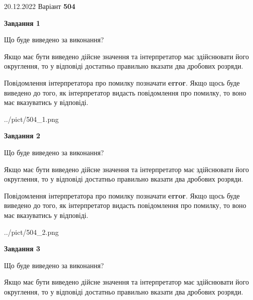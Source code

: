 \documentclass[12pt, ukrainian]{article}
\begin{document}
{20.12.2022 Варіант \No \textbf { 504 }\par}
{
\begin {Large}

{\begin {center}\textbf{Завдання 1}\end {center}}\par
Що буде виведено за виконання? \par

Якщо має бути виведено дійсне значення та інтерпретатор має здійснювати його округлення, 
то у відповіді достатньо правильно вказати два дробових розряди.

Повідомлення інтерпретатора про помилку позначати \textbf{error}.
Якщо щось буде виведено до того, як інтерпретатор видасть повідомлення про помилку, 
то воно має вказуватись у відповіді. \par

\begin{center}
	{../pict/504_1.png}
\end{center}
\newpage

{\begin {center}\textbf{Завдання 2}\end {center}}\par
Що буде виведено за виконання? \par

Якщо має бути виведено дійсне значення та інтерпретатор має здійснювати його округлення, 
то у відповіді достатньо правильно вказати два дробових розряди.

Повідомлення інтерпретатора про помилку позначати \textbf{error}.
Якщо щось буде виведено до того, як інтерпретатор видасть повідомлення про помилку, 
то воно має вказуватись у відповіді. \par

\begin{center}
	{../pict/504_2.png}
\end{center}
\newpage

{\begin {center}\textbf{Завдання 3}\end {center}}\par
Що буде виведено за виконання? \par

Якщо має бути виведено дійсне значення та інтерпретатор має здійснювати його округлення, 
то у відповіді достатньо правильно вказати два дробових розряди.


\end{Large}}
\end{document}
